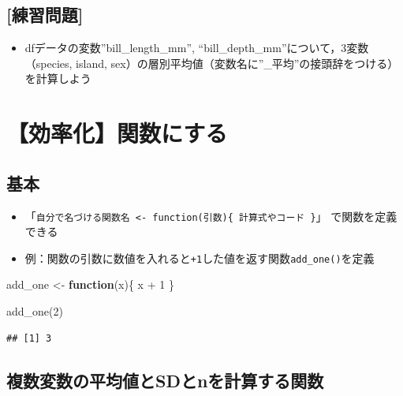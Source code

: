 \documentclass[
  xelatex,ja=standard, b5paper]{bxjsbook}
\newenvironment{Shaded}{\begin{snugshade}}{\end{snugshade}}
\newcommand{\ControlFlowTok}[1]{\textcolor[rgb]{0.13,0.29,0.53}{\textbf{#1}}}
\newcommand{\DecValTok}[1]{\textcolor[rgb]{0.00,0.00,0.81}{#1}}
\newcommand{\FunctionTok}[1]{\textcolor[rgb]{0.00,0.00,0.00}{#1}}
\newcommand{\NormalTok}[1]{#1}
\newcommand{\OtherTok}[1]{\textcolor[rgb]{0.56,0.35,0.01}{#1}}
\newcommand{\SpecialCharTok}[1]{\textcolor[rgb]{0.00,0.00,0.00}{#1}}
\providecommand{\tightlist}{%
  \setlength{\itemsep}{0pt}\setlength{\parskip}{0pt}}
\begin{document}
\hypertarget{ux7df4ux7fd2ux554fux984c-16}{%
\subsection{{[}練習問題{]}}\label{ux7df4ux7fd2ux554fux984c-16}}

\begin{itemize}
\tightlist
\item
  dfデータの変数''bill\_length\_mm'', ``bill\_depth\_mm''について，3変数（species, island, sex）の層別平均値（変数名に''\_平均''の接頭辞をつける）を計算しよう
\end{itemize}

\hypertarget{su-fun}{%
\section{【効率化】関数にする}\label{su-fun}}

\hypertarget{su-fun-st}{%
\subsection{基本}\label{su-fun-st}}

\begin{itemize}
\tightlist
\item
  「\texttt{自分で名づける関数名\ \textless{}-\ function(引数)\{\ 計算式やコード\ \}}」 で関数を定義できる
\item
  例：関数の引数に数値を入れると\texttt{+1}した値を返す関数\texttt{add\_one()}を定義
\end{itemize}

\begin{Shaded}
\begin{Highlighting}[]
\NormalTok{add\_one }\OtherTok{\textless{}{-}} 
  \ControlFlowTok{function}\NormalTok{(x)\{}
\NormalTok{    x }\SpecialCharTok{+} \DecValTok{1}
\NormalTok{  \}}

\FunctionTok{add\_one}\NormalTok{(}\DecValTok{2}\NormalTok{)}
\end{Highlighting}
\end{Shaded}

\begin{verbatim}
## [1] 3
\end{verbatim}

\hypertarget{su-fun-meansdn}{%
\subsection{複数変数の平均値とSDとnを計算する関数}\label{su-fun-meansdn}}
\end{document}
